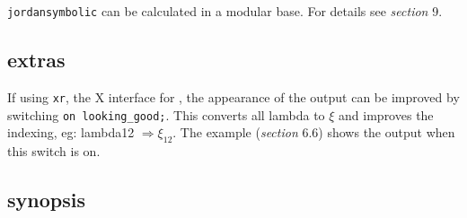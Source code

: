 {\tt jordansymbolic} can be calculated in a modular base. For details
see {\it section} 9.

\subsection{extras}

If using {\tt xr}, the X interface for \REDUCE, the appearance of the
output can be improved by switching {\tt on looking\_good;}. This
converts all lambda to $\xi$ and improves the indexing, eg: lambda12
$\Rightarrow \xi_{12}$. The example ({\it section} 6.6) shows the
output when this switch is on.

\subsection{synopsis}

